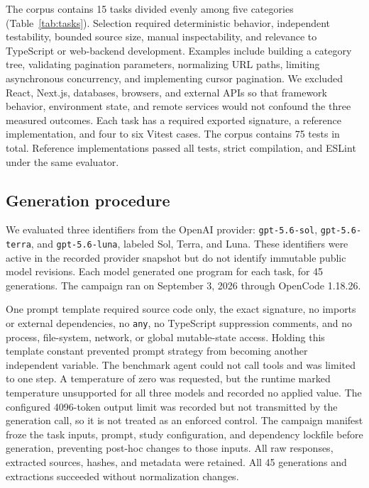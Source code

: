 \documentclass[conference]{IEEEtran}
\begin{document}
The corpus contains 15 tasks divided evenly among five categories (Table~\ref{tab:tasks}). Selection required deterministic behavior, independent testability, bounded source size, manual inspectability, and relevance to TypeScript or web-backend development. Examples include building a category tree, validating pagination parameters, normalizing URL paths, limiting asynchronous concurrency, and implementing cursor pagination. We excluded React, Next.js, databases, browsers, and external APIs so that framework behavior, environment state, and remote services would not confound the three measured outcomes. Each task has a required exported signature, a reference implementation, and four to six Vitest cases. The corpus contains 75 tests in total. Reference implementations passed all tests, strict compilation, and ESLint under the same evaluator.



\subsection{Generation procedure}
We evaluated three identifiers from the OpenAI provider: \texttt{gpt-5.6-sol}, \texttt{gpt-5.6-terra}, and \texttt{gpt-5.6-luna}, labeled Sol, Terra, and Luna. These identifiers were active in the recorded provider snapshot but do not identify immutable public model revisions. Each model generated one program for each task, for 45 generations. The campaign ran on September 3, 2026 through OpenCode 1.18.26.

One prompt template required source code only, the exact signature, no imports or external dependencies, no \texttt{any}, no TypeScript suppression comments, and no process, file-system, network, or global mutable-state access. Holding this template constant prevented prompt strategy from becoming another independent variable. The benchmark agent could not call tools and was limited to one step. A temperature of zero was requested, but the runtime marked temperature unsupported for all three models and recorded no applied value. The configured 4096-token output limit was recorded but not transmitted by the generation call, so it is not treated as an enforced control. The campaign manifest froze the task inputs, prompt, study configuration, and dependency lockfile before generation, preventing post-hoc changes to those inputs. All raw responses, extracted sources, hashes, and metadata were retained. All 45 generations and extractions succeeded without normalization changes.
\end{document}
